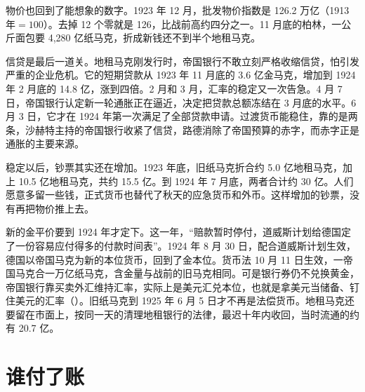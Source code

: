 
物价也回到了能想象的数字。1923 年 12 月，批发物价指数是 126.2 万亿（1913 年$=100$）\cite{sargent1982}。去掉 12 个零就是 126，比战前高约四分之一。11 月底的柏林，一公斤面包要 4,280 亿纸马克，折成新钱还不到半个地租马克\cite{bresciani1937}。

信贷是最后一道关。地租马克刚发行时，帝国银行不敢立刻严格收缩信贷，怕引发严重的企业危机。它的短期贷款从 1923 年 11 月底的 3.6 亿金马克，增加到 1924 年 2 月底的 14.8 亿，涨到四倍。2 月和 3 月，汇率的稳定又一次告急\cite{bresciani1937}。4 月 7 日，帝国银行认定新一轮通胀正在逼近，决定把贷款总额冻结在 3 月底的水平。6 月 3 日，它才在 1924 年第一次满足了全部贷款申请\cite{bresciani1937}。过渡货币能稳住，靠的是两条，沙赫特主持的帝国银行收紧了信贷，路德消除了帝国预算的赤字，而赤字正是通胀的主要来源\cite{luther1987}。

稳定以后，钞票其实还在增加。1923 年底，旧纸马克折合约 5.0 亿地租马克，加上 10.5 亿地租马克，共约 15.5 亿。到 1924 年 7 月底，两者合计约 30 亿\cite{bresciani1937}。人们愿意多留一些钱，正式货币也替代了秋天的应急货币和外币\cite{bresciani1937}。这样增加的钞票，没有再把物价推上去。

新的金平价要到 1924 年才定下。这一年，“赔款暂时停付，道威斯计划给德国定了一份容易应付得多的付款时间表”\cite{sargent1982}。1924 年 8 月 30 日，配合道威斯计划生效，德国以帝国马克为新的本位货币，回到了金本位\cite{luther1987}。货币法 10 月 11 日生效，一帝国马克合一万亿纸马克，含金量与战前的旧马克相同\cite{bresciani1937}。可是银行券仍不兑换黄金，帝国银行靠买卖外汇维持汇率，实际上是美元汇兑本位，也就是拿美元当储备、钉住美元的汇率（）。旧纸马克到 1925 年 6 月 5 日才不再是法偿货币。地租马克还要留在市面上，按同一天的清理地租银行的法律，最迟十年内收回，当时流通的约有 20.7 亿\cite{bresciani1937}。

\section{谁付了账}\label{sec:weimar-cost}

